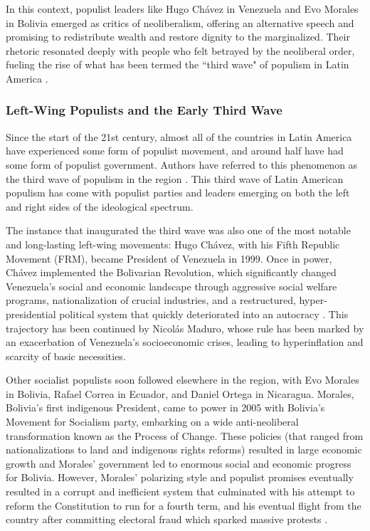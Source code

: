 \documentclass[12pt,letterpaper]{article}
\begin{document}
\noindent In this context, populist leaders like Hugo Chávez in Venezuela and Evo Morales in Bolivia emerged as critics of neoliberalism, offering an alternative speech and promising to redistribute wealth and restore dignity to the marginalized. Their rhetoric resonated deeply with people who felt betrayed by the neoliberal order, fueling the rise of what has been termed the ``third wave" of populism in Latin America\autocite{levitskyResurgenceLatinAmerican2011} .

\vspace{.25cm}
\subsubsection{Left-Wing Populists and the Early Third Wave}

\vspace{.25cm}
\noindent Since the start of the 21st century, almost all of the countries in Latin America have experienced some form of populist movement, and around half have had some form of populist government. Authors have referred to this phenomenon as the third wave of populism in the region \autocite{muddePopulismVeryShort2017} . This third wave of Latin American populism has come with populist parties and leaders emerging on both the left and right sides of the ideological spectrum. 

The instance that inaugurated the third wave was also one of the most notable and long-lasting left-wing movements: Hugo Chávez, with his Fifth Republic Movement (FRM), became President of Venezuela in 1999. Once in power, Chávez implemented the Bolivarian Revolution, which significantly changed Venezuela's social and economic landscape through aggressive social welfare programs, nationalization of crucial industries, and a restructured, hyper-presidential political system that quickly deteriorated into an autocracy\autocite{cannonHugoChavezBolivarian2009} . This trajectory has been continued by Nicolás Maduro, whose rule has been marked by an exacerbation of Venezuela's socioeconomic crises, leading to hyperinflation and scarcity of basic necessities. 

Other socialist populists soon followed elsewhere in the region, with Evo Morales in Bolivia, Rafael Correa in Ecuador, and Daniel Ortega in Nicaragua. Morales, Bolivia's first indigenous President, came to power in 2005 with Bolivia's Movement for Socialism party, embarking on a wide anti-neoliberal transformation known as the Process of Change. These policies (that ranged from nationalizations to land and indigenous rights reforms) resulted in large economic growth and Morales' government led to enormous social and economic progress for Bolivia. However, Morales' polarizing style and populist promises eventually resulted in a corrupt and inefficient system that culminated with his attempt to reform the Constitution to run for a fourth term, and his eventual flight from the country after committing electoral fraud which sparked massive protests\autocite{smithElevenYearsProcess} . 
\end{document}

